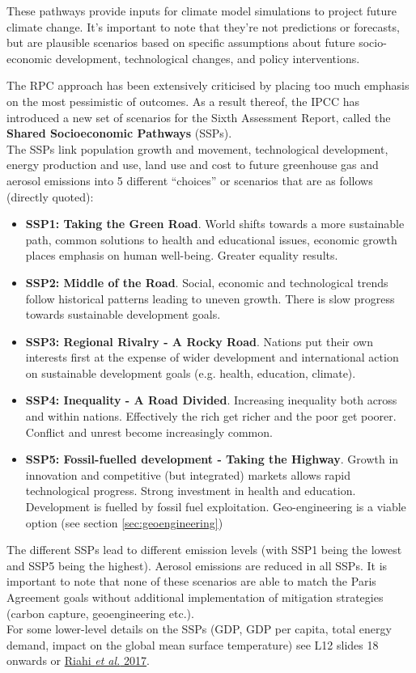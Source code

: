 These pathways provide inputs for climate model simulations to project future 
climate change. It's important to note that they're not predictions or forecasts,
but are plausible scenarios based on specific assumptions about future 
socio-economic development, technological changes, and policy interventions. 

The RPC approach has been extensively criticised by placing too much emphasis on
the most pessimistic of outcomes. As a result thereof, the \gls{IPCC} has
introduced a new set of scenarios for the Sixth Assessment Report, called the
\textbf{Shared Socioeconomic Pathways} (SSPs).\\


\noindent The SSPs link population growth and movement, technological development, energy
production and use, land use and cost to future greenhouse gas and aerosol
emissions into 5 different ``choices'' or scenarios that are as follows (directly
quoted):
\begin{itemize}
    \item \textbf{SSP1: Taking the Green Road}. World shifts towards a more sustainable
    path, common solutions to health and educational issues, economic growth
    places emphasis on human well-being. Greater equality results.
    \item \textbf{SSP2: Middle of the Road}. Social, economic and technological trends follow
    historical patterns leading to uneven growth. There is slow progress
    towards sustainable development goals.
    \item \textbf{SSP3: Regional Rivalry - A Rocky Road}. Nations put their own interests first
    at the expense of wider development and international action on sustainable
    development goals (e.g. health, education, climate).
    \item \textbf{SSP4: Inequality - A Road Divided}. Increasing inequality both across and
    within nations. Effectively the rich get richer and the poor get poorer.
    Conflict and unrest become increasingly common.
    \item \textbf{SSP5: Fossil-fuelled development - Taking the Highway}. Growth in innovation
    and competitive (but integrated) markets allows rapid technological progress.
    Strong investment in health and education. Development is fuelled by fossil
    fuel exploitation. Geo-engineering is a viable option (see section 
    \ref{sec:geoengineering})
\end{itemize}

The different SSPs lead to different emission levels (with SSP1 being the lowest
and SSP5 being the highest). Aerosol emissions are reduced in all SSPs.
It is important to note that none of these scenarios
are able to match the Paris Agreement goals without additional implementation of
mitigation strategies (carbon capture, geoengineering etc.).\\

For some lower-level details on the SSPs (GDP, GDP per capita, total energy 
demand, impact on the global mean surface temperature) see L12 slides 18 onwards or 
\href{https://www.sciencedirect.com/science/article/pii/S0959378016300681}{Riahi
\textit{et al.} 2017}.

